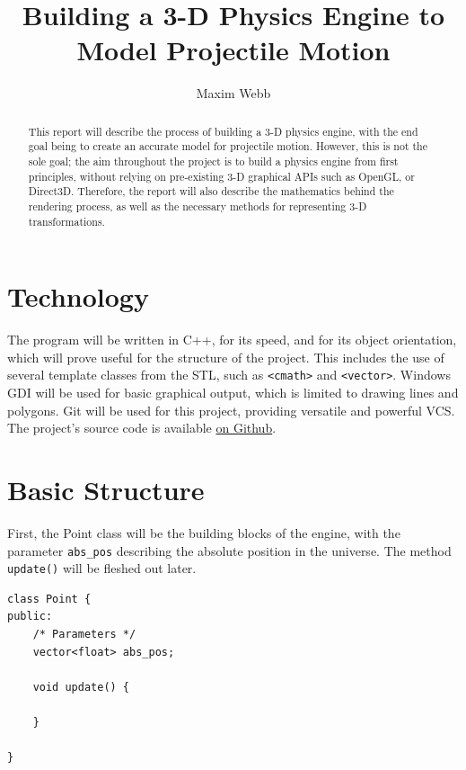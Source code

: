 \documentclass{article}
\title{
	\Huge
	{Building a 3-D Physics Engine to Model Projectile Motion}\\
}
\author{Maxim Webb}
\begin{document}
\maketitle

\newpage

\begin{abstract}
This report will describe the process of building a 3-D physics engine, with the end goal being to create an accurate model for projectile motion.
\newline
\newline
However, this is not the sole goal; the aim throughout the project is to build a physics engine from first principles, without relying on pre-existing 3-D graphical APIs such as OpenGL, or Direct3D. Therefore, the report will also describe the mathematics behind the rendering process, as well as the necessary methods for representing 3-D transformations.
\newline
\end{abstract}
\newpage
\tableofcontents

\newpage

\section{Technology}
The program will be written in C++, for its speed, and for its object orientation, which will prove useful for the structure of the project. This includes the use of several template classes from the STL, such as \verb|<cmath>| and \verb|<vector>|.
\newline
\newline
Windows GDI will be used for basic graphical output, which is limited to drawing lines and polygons. 
\newline
\newline
Git will be used for this project, providing versatile and powerful VCS. The project's source code is available 
\href{https://github.com/maximwebb/3D-engine}{\color{blue} on Github}\color{black}.

\newpage
\section{Basic Structure}

First, the Point class will be the building blocks of the engine, with the parameter \verb|abs_pos| describing the absolute position in the universe. The method \verb|update()| will be fleshed out later.
\begin{lstlisting}
class Point {
public:
	/* Parameters */
	vector<float> abs_pos;
	
	void update() {
	
	}

}
\end{lstlisting}
\end{document}
